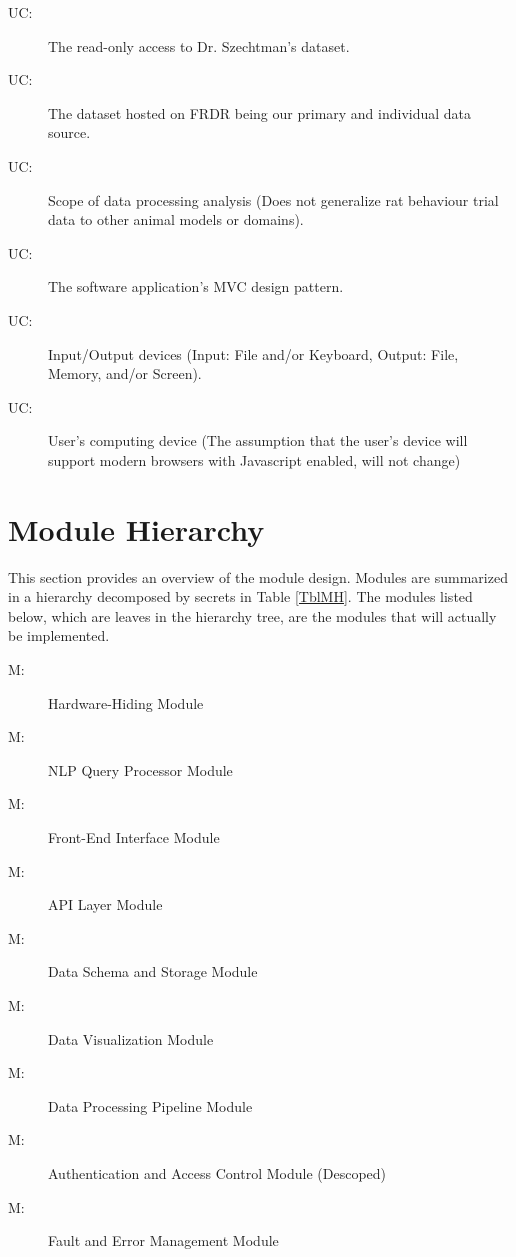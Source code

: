 \documentclass[12pt, titlepage]{article}
\newcounter{ucnum}
\newcommand{\uctheucnum}{UC\theucnum}
\newcounter{mnum}
\newcommand{\mthemnum}{M\themnum}
\begin{document}
\begin{description}
\item[ \uctheucnum \label{ucReadOnlyDataset}:] The read-only access 
  to Dr. Szechtman's dataset.
\item[ \uctheucnum \label{ucSoleDataSource}:] The dataset hosted on FRDR 
  being our primary and individual data source.
\item[ \uctheucnum \label{ucDataProcessingScope}:] Scope of data 
  processing analysis (Does not generalize rat behaviour trial data to other animal models 
  or domains).
\item[ \uctheucnum \label{ucMVCDesignPattern}:] The software application's MVC design pattern.
\item[ \uctheucnum \label{ucIO}:] Input/Output devices
  (Input: File and/or Keyboard, Output: File, Memory, and/or Screen).
\item[ \uctheucnum \label{ucUserComputingDevice}:] User's computing device 
  (The assumption that the user's device will support modern browsers with Javascript enabled, 
  will not change)
\end{description}

\section{Module Hierarchy} \label{SecMH}

This section provides an overview of the module design. Modules are summarized
in a hierarchy decomposed by secrets in Table \ref{TblMH}. The modules listed
below, which are leaves in the hierarchy tree, are the modules that will
actually be implemented.

\begin{description}
\item [ \mthemnum \label{mHH}:] Hardware-Hiding Module
\item [ \mthemnum \label{mNLP}:] NLP Query Processor Module
\item [ \mthemnum \label{mUI}:] Front-End Interface Module
\item [ \mthemnum \label{mAPI}:] API Layer Module
\item [ \mthemnum \label{mDSS}:] Data Schema and Storage Module
\item [ \mthemnum \label{mDV}:] Data Visualization Module
\item [ \mthemnum \label{mDPP}:] Data Processing Pipeline Module
\item [ \mthemnum \label{mAAC}:] Authentication and Access Control Module (Descoped)
\item [ \mthemnum \label{mFEM}:] Fault and Error Management Module
\end{description}
\end{document}
